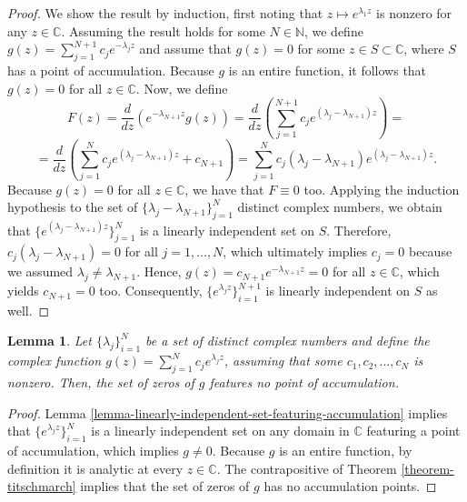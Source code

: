 \documentclass[12pt]{report} %
\newtheorem{lemma}{Lemma}
\begin{document}
\begin{proof}
  We show the result by induction, first noting that $z \mapsto e^{\lambda_1
  z}$ is nonzero for any $z \in \mathbb{C}$. Assuming the result holds for
  some $N \in \mathbb{N}$, we define $g (z) = \sum_{j = 1}^{N + 1} c_j e^{-
  \lambda_j z}$ and assume that $g (z) = 0$ for some $z \in S \subset
  \mathbb{C}$, where $S$ has a point of accumulation. Because $g$ is an entire
  function, it follows that $g (z) = 0$ for all $z \in \mathbb{C}$. Now, we
  define
  \[ F (z) = \frac{d}{d z} (e^{- \lambda_{N + 1} z} g (z)) = \frac{d}{d z}
     \left( \sum_{j = 1}^{N + 1} c_j e^{(\lambda_j - \lambda_{N + 1}) z}
     \right) = \]
  \[ = \frac{d}{d z} \left( \sum_{j = 1}^N c_j e^{(\lambda_j - \lambda_{N +
     1}) z} + c_{N + 1} \right) = \sum_{j = 1}^N c_j (\lambda_j - \lambda_{N +
     1}) e^{(\lambda_j - \lambda_{N + 1}) z} . \]
  Because $g (z) = 0$ for all $z \in \mathbb{C}$, we have that $F \equiv 0$
  too. Applying the induction hypothesis to the set of $\{ \lambda_j -
  \lambda_{N + 1} \}_{j = 1}^N$ distinct complex numbers, we obtain that $\{
  e^{(\lambda_j - \lambda_{N + 1}) z} \}_{j = 1}^N$ is a linearly independent
  set on $S$. Therefore, $c_j (\lambda_j - \lambda_{N + 1}) = 0$ for all $j =
  1, \ldots, N$, which ultimately implies $c_j = 0$ because we assumed
  $\lambda_j \neq \lambda_{N + 1}$. Hence, $g (z) = c_{N + 1} e^{- \lambda_{N
  + 1} z} = 0$ for all $z \in \mathbb{C}$, which yields $c_{N + 1} = 0$ too.
  Consequently, $\{ e^{\lambda_j z} \}_{i = 1}^{N + 1}$ is linearly
  independent on $S$ as well.
\end{proof}

\begin{lemma}
  \label{lemma-no-accumulation-point}Let $\{ \lambda_j \}_{i = 1}^N$ be a set
  of distinct complex numbers and define the complex function $g (z) = \sum_{j
  = 1}^N c_j e^{\lambda_j z}$, assuming that some $c_1, c_2, \ldots, c_N$ is
  nonzero. Then, the set of zeros of $g$ features no point of accumulation.
\end{lemma}

\begin{proof}
  Lemma \ref{lemma-linearly-independent-set-featuring-accumulation} implies
  that $\{ e^{\lambda_j z} \}_{i = 1}^N$ is a linearly independent set on any
  domain in $\mathbb{C}$ featuring a point of accumulation, which implies $g
  \neq 0$. Because $g$ is an entire function, by definition it is analytic at
  every $z \in \mathbb{C}$. The contrapositive of Theorem
  \ref{theorem-titschmarch} implies that the set of zeros of $g$ has no
  accumulation points.
\end{proof}
\end{document}
